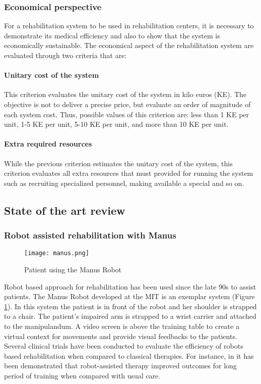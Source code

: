 \documentclass[preprint,authoryear,12pt]{elsarticle}
\begin{document}
\subsubsection{Economical perspective}
For a rehabilitation system to be used in rehabilitation centers, it is necessary to demonstrate its medical efficiency and also to show that the system is economically sustainable. The economical aspect of the rehabilitation system are evaluated through two criteria that are:
\par
\paragraph{Unitary cost of the system}
\par
This criterion evaluates the unitary cost of the system in kilo euros (KE). The objective is not to deliver a precise price, but evaluate an order of magnitude of each system cost. Thus, possible values of this criterion are: less than 1 KE per unit, 1-5 KE per unit, 5-10 KE per unit, and more than 10  KE per unit.
\par
\paragraph{Extra required resources}
\par
While the previous criterion estimates the unitary cost of the system, this criterion evaluates all extra resources that must provided for running the system such as recruiting specialized personnel, making available a special and so on.

\subsection{State of the art review}  
\par
\subsubsection{Robot assisted rehabilitation with Manus}

\begin{figure}[h]
	\centering
		\texttt{[image: manus.png]}
	\caption{Patient using the Manus Robot \citep{Volpe2001}}
	\label{fig:manus}
\end{figure}

Robot based approach for rehabilitation has been used since the late 90s to assist patients. The Manus Robot developed at the MIT \citep{Volpe2001} is an exemplar system (Figure \ref{fig:manus}). In this system the patient is in front of the robot and her shoulder is strapped to a chair. The patient's impaired arm is strapped to a wrist carrier and attached to the manipulandum. A video screen is above the training table to create a virtual context for movements and provide visual feedbacks to the patients. Several clinical trials have been conducted to evaluate the efficiency of robots based rehabilitation when compared to classical therapies. For instance, in \citep{LoAlbertC2010} it has been demonstrated that robot-assisted therapy improved outcomes for long period of training when compared with usual care.
\end{document}
